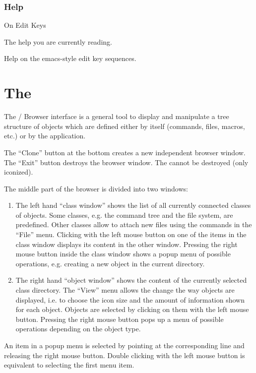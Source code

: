 \subsubsection{Help}
\begin{DLsf}{On Edit Keys}
\item[On Kxterm]
         The help you are currently reading.
\item[On Edit Keys]
         Help on the emacs-style edit key sequences.
\end{DLsf}

\section{The \MB}

The \KUIP/\MOTIF{} Browser interface is a general tool to display and
manipulate a tree structure of objects which are defined either by \KUIP{}
itself (commands, files, macros, etc.) or by the application.

The ``Clone'' button at the bottom creates a new independent browser window.
The ``Exit'' button destroys the browser window. The \MB{} cannot be
destroyed (only iconized).

The middle part of the browser is divided into two windows:

\begin{enumerate}
\item The left hand ``class window'' shows the list of all currently connected
   classes of objects.  Some classes, e.g. the command tree and the file
   system, are predefined.  Other classes allow to attach new files using the
   commands in the ``File'' menu.  Clicking with the left mouse button on
   one of
   the items in the class window displays its content in the other window.
   Pressing the right mouse button inside the class window shows a popup menu
   of possible operations, e.g. creating a new object in the current
   directory.

\item The right hand ``object window'' shows the content of the currently
   selected class directory.  The ``View'' menu allows the change the way
   objects are displayed, i.e. to choose the icon size and the amount of
   information shown for each object.  Objects are selected by clicking on
   them with the left mouse button.  Pressing the right mouse button pops up a
   menu of possible operations depending on the object type.
\end{enumerate}

   An item in a popup menu is selected by pointing at the corresponding line
   and releasing the right mouse button.  Double clicking with the left mouse
   button is equivalent to selecting the first menu item.


